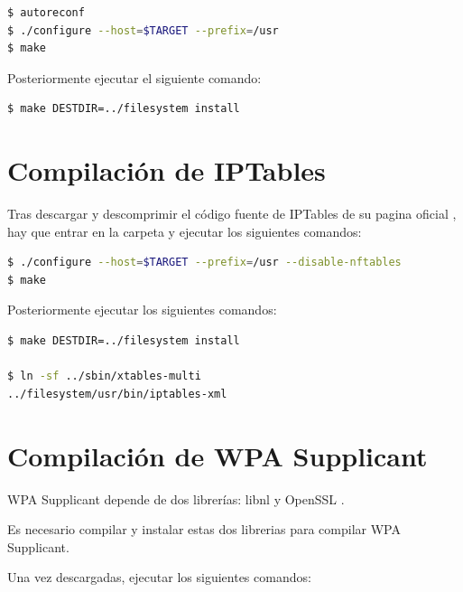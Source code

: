 \documentclass{tfg}
\begin{document}
\begin{lstlisting}[language=bash,caption=Compilacion de Sudo (1)]
$ autoreconf
$ ./configure --host=$TARGET --prefix=/usr
$ make
\end{lstlisting}

Posteriormente ejecutar el siguiente comando:
\begin{lstlisting}[language=bash,caption=Compilacion de Sudo (2)]
$ make DESTDIR=../filesystem install
\end{lstlisting}
%

\section{Compilación de IPTables}
Tras descargar y descomprimir el código fuente de IPTables de su pagina oficial \cite{iptables}, hay que entrar en la carpeta y ejecutar
los siguientes comandos:

\begin{lstlisting}[language=bash,caption=Compilacion de IPTables (1)]
$ ./configure --host=$TARGET --prefix=/usr --disable-nftables
$ make
\end{lstlisting}
\iffalse $ \fi %

Posteriormente ejecutar los siguientes comandos:
\begin{lstlisting}[language=bash,caption=Compilacion de IPTables (2)]
$ make DESTDIR=../filesystem install

$ ln -sf ../sbin/xtables-multi
../filesystem/usr/bin/iptables-xml
\end{lstlisting}
%

\section{Compilación de WPA Supplicant}
WPA Supplicant depende de dos librerías: libnl \cite{libnl} y OpenSSL \cite{openssl}.

Es necesario compilar y instalar estas dos librerias para compilar WPA Supplicant.

Una vez descargadas, ejecutar los siguientes comandos:
\end{document}
